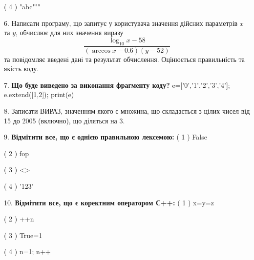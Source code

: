 \documentclass[11pt]{article}
\begin{document}
( 4 ) "abc"""
\par\vspace{5mm}

6. 
Написати програму, що запитує у користувача значення дійсних параметрів $x$ та $y$, обчислює для них значення виразу 
$$\frac{\log_{10} x - 58}{(\arccos x - 0.6) (y - 52)}$$ 
та повiдомляє введенi данi та результат обчислення.
 Оцінюється правильність та якість коду.

\par\vspace{5mm}

7. \textbf{Що буде виведено за виконання фрагменту коду?}
e=['0','1','2','3','4']; e.extend([1,2]); print(e)\par\vspace{5mm}

8. 
Записати ВИРАЗ, значенням якого є множина, що складається з цілих чисел від 15 до 2005 (включно), що діляться на 3.\par\vspace{5mm}

9. %
\textbf{Відмітити все, що є однією правильною лексемою:}
( 1 ) False

( 2 ) fop

( 3 ) <>

( 4 ) '123'
\par\vspace{5mm}

10. %
\textbf{Відмітити все, що є коректним оператором С++:}
( 1 ) x=y=z

( 2 ) ++n

( 3 ) True=1

( 4 ) n=1; n++
\par\vspace{5mm}

\newpage
\end{document}
